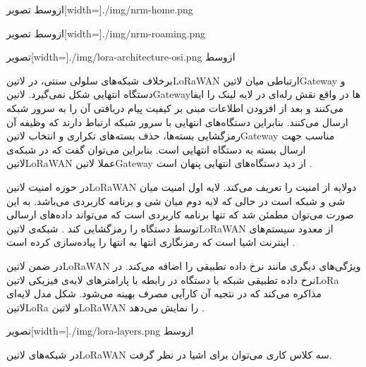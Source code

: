 ‌ازوسط
‌تصویر[width=\textwidth]{./img/nrm-home.png}

‌ازوسط
‌تصویر[width=\textwidth]{./img/nrm-roaming.png}

‌تصویر[width=\textwidth]{./img/lora-architecture-osi.png}
‌ازوسط

برخلاف شبکه‌های سلولی سنتی، در ‌لاتین{LoRaWAN} ارتباطی میان ‌لاتین{Gateway} و دستگاه انتهایی شکل نمی‌گیرد.
‌لاتین{Gateway}ها در واقع نقش رله‌ای در لایه لینک را ایفا می‌کنند و بعد از افزودن اطلاعات مبنی بر کیفیت پیام دریافتی آن
را به سرور شبکه ارسال می‌کنند. بنابراین دستگاه‌های انتهایی با سرور شبکه ارتباط دارند که وظیفه آن رمزگشایی بسته‌ها، حذف بسته‌های تکراری و
انتخاب ‌لاتین{Gateway} مناسب جهت ارسال بسته به دستگاه انتهایی است.
بنابراین می‌توان گفت که در شبکه‌ی ‌لاتین{LoRaWAN} عملا ‌لاتین{Gateway} از دید دستگاه‌های انتهایی پنهان است
.

در حوزه امنیت ‌لاتین{LoRaWAN} دولایه از امنیت را تعریف می‌کند. لایه اول امنیت میان شی و شبکه است در حالی که لایه دوم میان شی و برنامه کاربردی می‌باشد.
به این صورت می‌توان مطمئن شد که تنها برنامه کاربردی است که می‌تواند داده‌های ارسالی توسط دستگاه را رمزگشایی کند
. شبکه‌ی ‌لاتین{LoRaWAN} از معدود سیستم‌های اینترنت اشیا است که رمزنگاری انتها به انتها را پیاده‌سازی کرده است
.

در ضمن ‌لاتین{LoRaWAN} ویژگی‌های دیگری مانند نرخ داده تطبیقی را اضافه می‌کند. در نرخ داده تطبیقی شبکه با دستگاه در رابطه با پارامترهای لایه‌ی فیزیکی ‌لاتین{LoRa} مذاکره می‌کند
که در نتجیه آن کارآیی مصرف بهینه می‌شود. شکل  مدل لایه‌ای ‌لاتین{LoRa} و ‌لاتین{LoRaWAN} را نمایش می‌دهد
.

‌تصویر[width=\textwidth]{./img/lora-layers.png}
‌ازوسط

در شبکه‌های ‌لاتین{LoRaWAN} سه کلاس کاری می‌توان برای اشیا در نظر گرفت.

